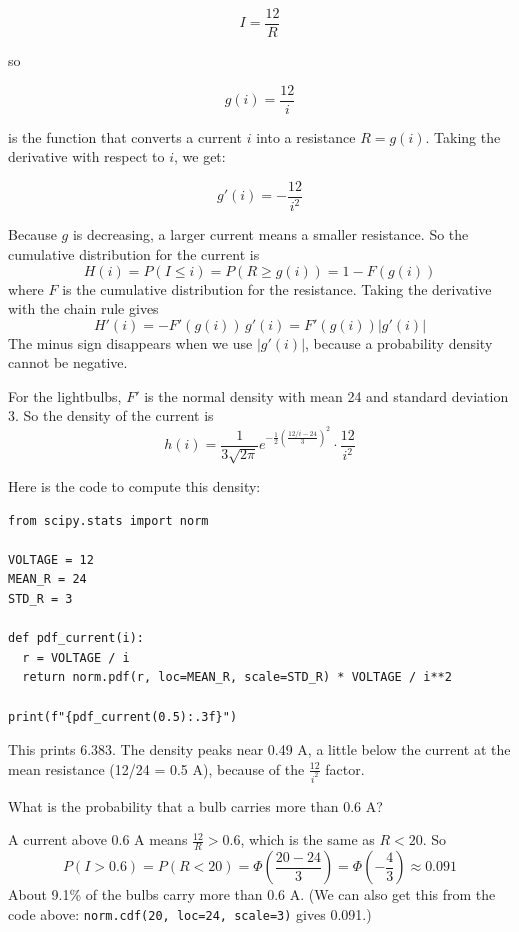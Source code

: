 $$I = \frac{12}{R}$$

so 

$$g(i) = \frac{12}{i}$$

is the function that converts a current $i$ into a resistance $R = g(i)$. Taking the derivative with respect to $i$, we get:

$$g'(i) = -\frac{12}{i^2}$$


Because $g$ is decreasing, a larger current means a smaller resistance. So the cumulative distribution for the current is
$$H(i) = P(I \leq i) = P\left(R \geq g(i)\right) = 1 - F(g(i))$$
where $F$ is the cumulative distribution for the resistance. Taking the derivative with the chain rule gives
$$H'(i) = -F'(g(i))\,g'(i) = F'(g(i))\left| g'(i) \right|$$
The minus sign disappears when we use $\left| g'(i) \right|$, because a probability density cannot be negative.

For the lightbulbs, $F'$ is the normal density with mean 24 and standard deviation 3. So the density of the current is
$$h(i) = \frac{1}{3\sqrt{2\pi}} e^{-\frac{1}{2}\left(\frac{12/i - 24}{3}\right)^2} \cdot \frac{12}{i^2}$$

Here is the code to compute this density:

\begin{verbatim}
from scipy.stats import norm

VOLTAGE = 12
MEAN_R = 24
STD_R = 3

def pdf_current(i):
  r = VOLTAGE / i
  return norm.pdf(r, loc=MEAN_R, scale=STD_R) * VOLTAGE / i**2

print(f"{pdf_current(0.5):.3f}")
\end{verbatim}

This prints $6.383$. The density peaks near 0.49 A, a little below the current at the mean resistance (12/24 = 0.5 A), because of the $\frac{12}{i^2}$ factor.

\begin{Worked}
\begin{Problem}
What is the probability that a bulb carries more than 0.6 A?
\end{Problem}
\begin{Solution}
A current above 0.6 A means $\frac{12}{R} > 0.6$, which is the same as $R < 20$. So
$$P(I > 0.6) = P(R < 20) = \Phi\left(\frac{20 - 24}{3}\right) = \Phi\left(-\frac{4}{3}\right) \approx 0.091$$
About 9.1\% of the bulbs carry more than 0.6 A. (We can also get this from the code above: \texttt{norm.cdf(20, loc=24, scale=3)} gives 0.091.)
\end{Solution}
\end{Worked}

